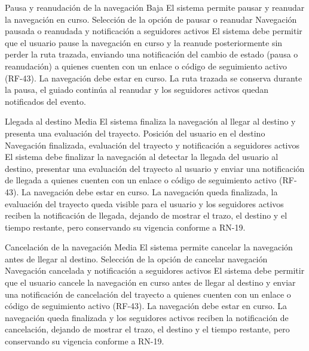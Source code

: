   {Pausa y reanudación de la navegación}%
  {Baja}%
  {El sistema permite pausar y reanudar la navegación en curso.}%
  {Selección de la opción de pausar o reanudar}%
  {Navegación pausada o reanudada y notificación a seguidores activos}%
  {El sistema debe permitir que el usuario pause la navegación en curso y la reanude posteriormente sin perder la ruta trazada, enviando una notificación del cambio de estado (pausa o reanudación) a quienes cuenten con un enlace o código de seguimiento activo (RF-43).}%
  {La navegación debe estar en curso.}%
  {La ruta trazada se conserva durante la pausa, el guiado continúa al reanudar y los seguidores activos quedan notificados del evento.}%

  {Llegada al destino}%
  {Media}%
  {El sistema finaliza la navegación al llegar al destino y presenta una evaluación del trayecto.}%
  {Posición del usuario en el destino}%
  {Navegación finalizada, evaluación del trayecto y notificación a seguidores activos}%
  {El sistema debe finalizar la navegación al detectar la llegada del usuario al destino, presentar una evaluación del trayecto al usuario y enviar una notificación de llegada a quienes cuenten con un enlace o código de seguimiento activo (RF-43).}%
  {La navegación debe estar en curso.}%
  {La navegación queda finalizada, la evaluación del trayecto queda visible para el usuario y los seguidores activos reciben la notificación de llegada, dejando de mostrar el trazo, el destino y el tiempo restante, pero conservando su vigencia conforme a RN-19.}%

  {Cancelación de la navegación}%
  {Media}%
  {El sistema permite cancelar la navegación antes de llegar al destino.}%
  {Selección de la opción de cancelar navegación}%
  {Navegación cancelada y notificación a seguidores activos}%
  {El sistema debe permitir que el usuario cancele la navegación en curso antes de llegar al destino y enviar una notificación de cancelación del trayecto a quienes cuenten con un enlace o código de seguimiento activo (RF-43).}%
  {La navegación debe estar en curso.}%
  {La navegación queda finalizada y los seguidores activos reciben la notificación de cancelación, dejando de mostrar el trazo, el destino y el tiempo restante, pero conservando su vigencia conforme a RN-19.}%

